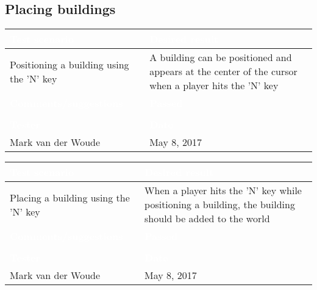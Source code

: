 \subsection{Placing buildings}

\begin{tabularx}{\textwidth}{|X|X|}
\hline
\rowcolor{lightgray}\textcolor{white}{\textbf{Test scenario}} &
\textcolor{white}{\textbf{Desired result}}       
\\\hline
Positioning a building using the 'N' key & A building can be positioned and appears at the center of the cursor when a player hits the 'N' key          
\\\hline
\rowcolor{lightgray}\textcolor{white}{\textbf{Comments/suggestions}} & 
\textcolor{white}{\textbf{Passed}}
\\\hline
 & \cellcolor{green}                       
\\\hline
\rowcolor{lightgray}\textcolor{white}{\textbf{Tester}} & \cellcolor{lightgray}\textcolor{white}{\textbf{Date}}               
\\\hline
Mark van der Woude & May 8, 2017                               		 
\\\hline
\end{tabularx}

\begin{tabularx}{\textwidth}{|X|X|}
\hline
\rowcolor{lightgray}\textcolor{white}{\textbf{Test scenario}} &
\textcolor{white}{\textbf{Desired result}}       
\\\hline
Placing a building using the 'N' key &
When a player hits the 'N' key while positioning a building, the building should be added to the world       
\\\hline
\rowcolor{lightgray}\textcolor{white}{\textbf{Comments/suggestions}} & 
\textcolor{white}{\textbf{Passed}}
\\\hline
 & \cellcolor{green}                       
\\\hline
\rowcolor{lightgray}\textcolor{white}{\textbf{Tester}} & \cellcolor{lightgray}\textcolor{white}{\textbf{Date}}               
\\\hline
Mark van der Woude & May 8, 2017                               		 
\\\hline
\end{tabularx}

